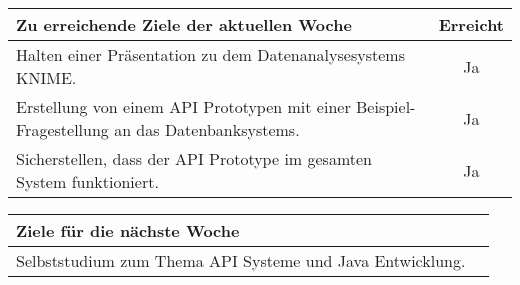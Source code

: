 \begin{tabularx}{\textwidth}{Xc}
    \arrayrulecolor{OliveGreen}
    \toprule
    {\bfseries Zu erreichende Ziele der aktuellen Woche} & {\bfseries Erreicht} \\
    \midrule[2pt]
    Halten einer Präsentation zu dem Datenanalysesystems KNIME.                  &Ja                    \\
    \rowcolor{OliveGreen!15}
    Erstellung von einem API Prototypen mit einer Beispiel-Fragestellung an das Datenbanksystems.	 &Ja                    \\
    \rowcolor{White}
    Sicherstellen, dass der API Prototype im gesamten System funktioniert.  &Ja \\
    \bottomrule[2pt]
\end{tabularx}
%
\vspace{1cm}
%
\begin{tabularx}{\textwidth}{Xc}
    \arrayrulecolor{OliveGreen}
    \toprule
    {\bfseries Ziele für die nächste Woche}              &                      \\
    \midrule[2pt]
    Selbststudium zum Thema API Systeme und Java Entwicklung.                                &                      \\
\end{tabularx}

